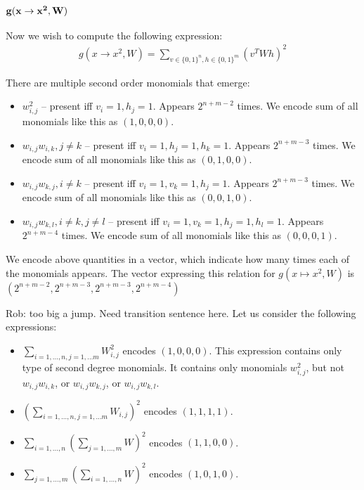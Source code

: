 \subsubsection{$\bf g(x \rightarrow x^2, W)$}

Now we wish to compute the following expression: 
\begin{gather*}
	g(x \rightarrow x^2, W) = \sum_{v \in \{0, 1\}^n, h \in \{0, 1\}^m} (v^TWh)^2
\end{gather*}

There are multiple second order monomials that emerge: 

\begin{itemize}
	\item $w_{i,j}^2$ -- present iff $v_i = 1, h_j = 1$. Appears $2^{n + m - 2}$ times. We encode sum of all monomials like this as $(1, 0, 0, 0)$.
	\item $w_{i,j} w_{i, k}, j \neq k$ -- present iff $v_i = 1, h_j = 1, h_k = 1$. Appears $2^{n + m - 3}$ times. We encode sum of all monomials like this as $(0, 1, 0, 0)$.	
	\item $w_{i,j} w_{k, j}, i \neq k$ -- present iff $v_i = 1, v_k = 1, h_j = 1$. Appears $2^{n + m - 3}$ times. We encode sum of all monomials like this as $(0, 0, 1, 0)$.
	\item $w_{i,j} w_{k, l}, i \neq k, j \neq l$ -- present iff $v_i = 1, v_k = 1, h_j = 1, h_l = 1$. Appears $2^{n + m - 4}$ times. We encode sum of all monomials like this as $(0, 0, 0, 1)$.
\end{itemize}
We encode above quantities in a vector, which indicate how many times
each of the monomials 
appears. The vector expressing this relation for $g(x \mapsto x^2, W)$ is $(2^{n + m - 2}, 2^{n + m - 3}, 2^{n + m - 3}, 2^{n + m - 4})$

Rob: too big a jump. Need transition sentence here.
Let us consider the following expressions: 
\begin{itemize}
 \item $\sum_{i = 1, \dots, n, j = 1, \dots m} W_{i, j}^2$ encodes $(1, 0, 0, 0)$. 
This expression contains only type of second degree monomials. 
It contains only monomials $w_{i, j}^2$, but not $w_{i, j} w_{i, k}$, or $w_{i, j} w_{k, j}$, or $w_{i, j} w_{k, l}$.
 \item $(\sum_{i = 1, \dots, n, j = 1, \dots m} W_{i, j})^2$ encodes $(1, 1, 1, 1)$.
 \item $\sum_{i = 1, \dots, n}(\sum_{j = 1, \dots, m} W)^2$ encodes $(1, 1, 0, 0)$. 
 \item $\sum_{j = 1, \dots, m}(\sum_{i = 1, \dots, n} W)^2$ encodes $(1, 0, 1, 0)$.
\end{itemize}
 
